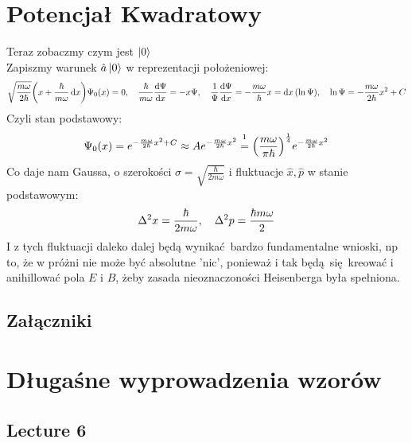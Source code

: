 \documentclass[12pt,a4paper]{report}
\newcommand{\phat}{\hat{p}}
\newcommand{\xhat}{\hat{x}}
\newenvironment{lecture}[1]{\par\medskip
   \noindent\chapter{#1} \rmfamily}{\medskip}
\begin{document}
\begin{lecture}{Potencjał Kwadratowy}
    Teraz zobaczmy czym jest $\ket{0}$\\
    Zapiszmy warunek $\hat{a}\ket{0}$ w reprezentacji położeniowej:
    \[
        \sqrt{\frac{m \omega}{2 \hbar}} \qty(x + \frac{\hbar}{m\omega}\dd{x}) \Psi_0(x) = 0\qc\frac{\hbar}{m\omega} \dv{\Psi}{x} = - x \Psi \qc \frac{1}{\Psi} \dv{\Psi}{x} = - \frac{m\omega}{\hbar} x = \dd{x}(\ln \Psi)\qc \ln\Psi = - \frac{m\omega}{2\hbar} x^2 + C
    \]
    Czyli stan podstawowy:
    \[
        \Psi_0(x) = e^{- \frac{m\omega}{2 \hbar} x^2 + C} \approx A e^{- \frac{m\omega}{2 \hbar} x^2} \stackrel{\footnotemark}{=} \qty(\frac{m\omega}{\pi \hbar})^{\frac14} e^{- \frac{m\omega}{2 \hbar} x^2}
    \]
    Co daje nam Gaussa, o szerokości $\sigma = \sqrt{\frac{\hbar}{2 m \omega}}$ i fluktuacje $\xhat, \phat$ w stanie podstawowym:\\
    \[
        \Delta^2 x = \frac{\hbar}{2 m \omega}\qc\Delta^2p = \frac{\hbar m \omega}{2}
    \]
    I z tych fluktuacji daleko dalej będą wynikać bardzo fundamentalne wnioski, np to, że w próżni nie może być absolutne 'nic', ponieważ i tak będą się kreować i anihillować pola $E$ i $B$, żeby zasada nieoznaczoności Heisenberga była spełniona.
\end{lecture}




\tableofcontents

\listoffigures

\printindex

\begin{center}
    \chapter*{Załączniki}
\end{center}

\appendix
\setcounter{table}{0}
\captionsetup[table]{name=Załącznik}
\captionsetup[figure]{name=Wyprowadzenie}
\captionsetup[section]{name=Lecture}

\chapter{Długaśne wyprowadzenia wzorów}

\section{Lecture 6}
\end{document}
